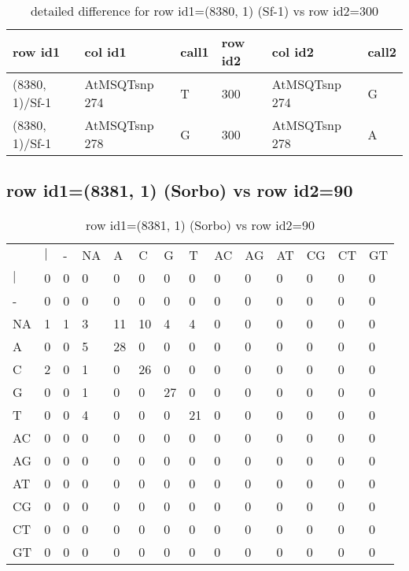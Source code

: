 \begin{center}
\begin{longtable}{|l|l|l|l|l|l|}
\caption{detailed difference for row id1=(8380, 1) (Sf-1) vs row id2=300} \label{table_dm623}\\
\hline
row id1&col id1&call1&row id2&col id2&call2\\
\hline
(8380, 1)/Sf-1&AtMSQTsnp 274&T&300&AtMSQTsnp 274&G\\
(8380, 1)/Sf-1&AtMSQTsnp 278&G&300&AtMSQTsnp 278&A\\
\hline
\end{longtable}
\end{center}

\subsection{row id1=(8381, 1) (Sorbo) vs row id2=90}
\begin{center}
\begin{longtable}{|l|l|l|l|l|l|l|l|l|l|l|l|l|l|}
\caption{row id1=(8381, 1) (Sorbo) vs row id2=90} \label{table_dm624}\\
\hline
\\
\hline
&$|$&-&NA&A&C&G&T&AC&AG&AT&CG&CT&GT\\
$|$&0&0&0&0&0&0&0&0&0&0&0&0&0\\
-&0&0&0&0&0&0&0&0&0&0&0&0&0\\
NA&1&1&3&11&10&4&4&0&0&0&0&0&0\\
A&0&0&5&28&0&0&0&0&0&0&0&0&0\\
C&2&0&1&0&26&0&0&0&0&0&0&0&0\\
G&0&0&1&0&0&27&0&0&0&0&0&0&0\\
T&0&0&4&0&0&0&21&0&0&0&0&0&0\\
AC&0&0&0&0&0&0&0&0&0&0&0&0&0\\
AG&0&0&0&0&0&0&0&0&0&0&0&0&0\\
AT&0&0&0&0&0&0&0&0&0&0&0&0&0\\
CG&0&0&0&0&0&0&0&0&0&0&0&0&0\\
CT&0&0&0&0&0&0&0&0&0&0&0&0&0\\
GT&0&0&0&0&0&0&0&0&0&0&0&0&0\\
\hline
\end{longtable}
\end{center}

